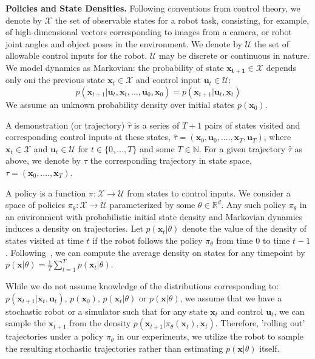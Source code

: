 \documentclass[10pt, conference]{ieeeconf}      %
\newcommand{\bu}{\mathbf{u}}
\newcommand{\bx}{\mathbf{x}}
\begin{document}
\noindent\textbf{Policies and State Densities.}
Following conventions from control theory, we denote by $\mathcal{X}$ the set of observable states for a robot task, consisting, for example, of 
high-dimensional vectors corresponding to images from a camera, or robot joint angles and object poses in the environment.
We denote by $\mathcal{U}$ the set of allowable control inputs for the robot. $\mathcal{U}$ may be discrete or
continuous in nature. We model dynamics as Markovian: the probability of state $\mathbf{x_{t+1}}\in
\mathcal{X}$ depends only oni the previous state $\mathbf{x}_t\in\mathcal{X}$ and control input $\mathbf{u}_t\in
\mathcal{U}$: 
$$p(\bx_{t+1}|\bu_{t},\bx_{t}, \ldots, \bu_{0}, \bx_{0})=p(\bx_{t+1}|\bu_{t}, \bx_t)$$
We assume an unknown probability density over initial states $p(\bx_0)$.

A demonstration (or trajectory) $\hat{\tau}$ is a series of $T+1$ pairs of states visited and corresponding
control inputs at these states, $\hat{\tau} = (\mathbf{x}_0,\mathbf{u}_0, ...., \mathbf{x}_T,\mathbf{u}_T)$, where $\bx_t\in \mathcal{X}$
and $\bu_t\in \mathcal{U}$ for $t\in \{0, \ldots, T\}$ and some $T\in \mathbb{N}$.  
For a given trajectory $\hat{\tau}$ as above, we denote by ${\tau}$ the corresponding trajectory in state space,
${\tau} = (\bx_0,....,\bx_T)$.

A policy is a function $\pi: \mathcal{X} \to \mathcal{U}$ from states to control inputs. 
We consider a space of policies $\pi_{\theta}:\mathcal{X}\to \mathcal{U}$ parameterized by some $\theta\in \mathbb{R}^d$. Any such policy $\pi_{\theta}$ in an environment with probabilistic initial state density and Markovian dynamics
induces a density on trajectories. Let $p(\bx_t|\theta)$ denote the value of the density of states visited at time $t$ if the robot follows the policy $\pi_{\theta}$ from time $0$ to time $t-1$.  Following~\cite{ross2010reduction}, we can compute
the average density on states for any timepoint by $p(\bx|\theta) = \frac{1}{T} \sum^T_{t=1} p(\bx_t|\theta)$.

While we do not assume knowledge of the distributions corresponding to: $p(\bx_{t+1}|\bx_t,\bu_t)$, $p(\bx_0)$, $p(\bx_t|
\theta)$ or $p(\bx|\theta)$, we assume that we have a stochastic robot or a simulator such that for any state
$\bx_t$ and control $\bu_t$, we can sample the $\bx_{t+1}$ from the density $p(\bx_{t+1}|\pi_{\theta}(\bx_t),\bx_t)$. 
Therefore, 'rolling out' trajectories under a policy
$\pi_{\theta}$ in our experiments, we utilize the robot to sample the resulting stochastic trajectories rather than
estimating $p(\bx|\theta)$ itself.
\end{document}
